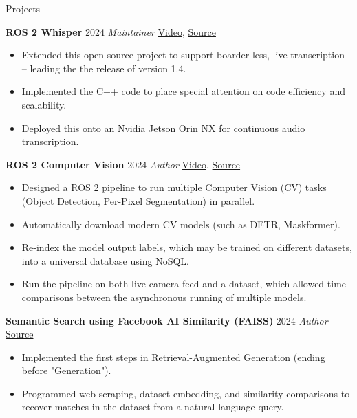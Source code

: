 \begin{rubric}{Projects}

\entry*[] \textbf{ROS 2 Whisper} \hfill 2024 \newline
\emph{Maintainer} \hfill  \href{https://github.com/ros-ai/ros2_whisper/blob/main/doc/harry_potter_sample.gif}{Video}, \href{https://github.com/ros-ai/ros2_whisper}{\faGithub Source} \newline
\vspace{\CVItemizeHeaderSpacing} \begin{itemize}[leftmargin=*, rightmargin=1cm]
	\setlength{\itemsep}{\CVItemizeSpacing}
	\item Extended this open source project to support boarder-less, live transcription -- leading the the release of version 1.4.
	\item Implemented the C++ code to place special attention on code efficiency and scalability.
	\item Deployed this onto an Nvidia Jetson Orin NX for continuous audio transcription.
\end{itemize}

\entry*[] \textbf{ROS 2 Computer Vision} \hfill 2024 \newline
\emph{Author} \hfill \href{https://github.com/NathanCorral/ROS-HF-Vision/blob/main/doc/gifs/ex_german_roads.gif}{Video}, \href{https://github.com/NathanCorral/ROS-HF-Vision/tree/main}{\faGithub Source} \newline
\vspace{\CVItemizeHeaderSpacing} \begin{itemize}[leftmargin=*, rightmargin=1cm]
	\setlength{\itemsep}{\CVItemizeSpacing}
	\item Designed a ROS 2 pipeline to run multiple Computer Vision (CV) tasks (Object Detection, Per-Pixel Segmentation) in parallel.  
	\item Automatically download modern CV models (such as DETR, Maskformer).  
	\item Re-index the model output labels, which may be trained on different datasets, into a universal database using NoSQL.  
	\item Run the pipeline on both live camera feed and a dataset, which allowed time comparisons between the asynchronous running of multiple models.
\end{itemize}

\entry*[] \textbf{Semantic Search using Facebook AI Similarity (FAISS)} \hfill 2024 \newline \emph{Author} \hfill \href{https://github.com/NathanCorral/Hugging-Face-FAISS-Semantic-Search}{\faGithub Source} \newline
\vspace{\CVItemizeHeaderSpacing} \begin{itemize}[leftmargin=*, rightmargin=1cm]
	\setlength{\itemsep}{\CVItemizeSpacing}
	\item Implemented the first steps in Retrieval-Augmented Generation (ending before "Generation").
	\item Programmed web-scraping, dataset embedding, and similarity comparisons to recover matches in the dataset from a natural language query.
\end{itemize}


\end{rubric}
